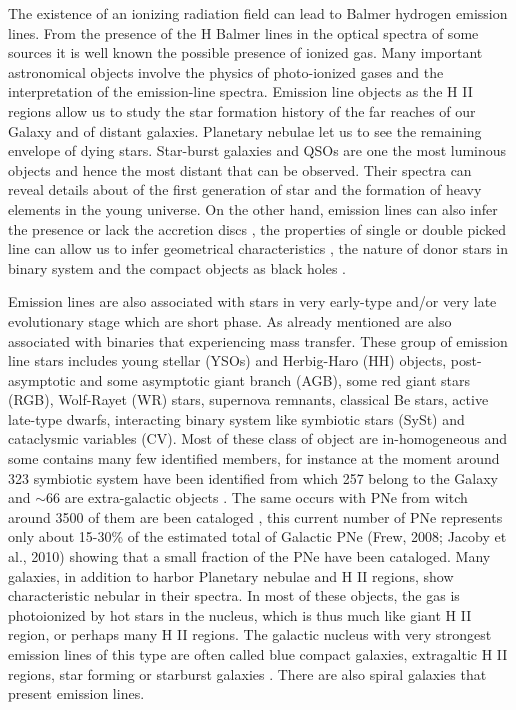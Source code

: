 \documentclass[fleqn,usenatbib]{mnras}
\begin{document}
The existence of an ionizing radiation field can lead to Balmer hydrogen
emission lines. From the presence  of the H Balmer lines in the optical
spectra of some sources it is well known the possible presence of ionized
gas. Many important astronomical objects involve the physics of photo-ionized
gases and the interpretation of the emission-line spectra. Emission line
objects as the H II regions allow us to study the star formation history
of the far reaches of our Galaxy and of distant galaxies. Planetary nebulae
let us to see the remaining envelope of dying stars. Star-burst galaxies and
QSOs are one the most luminous objects and hence the most distant that can
be observed. Their spectra can reveal details about of the first generation
of star and the formation of heavy elements in the young universe. On the
other hand, emission lines can also infer the presence or lack the accretion
discs \citep{Schwope:2000, Ratti:2012}, the properties of single or double
picked line can allow us to infer geometrical characteristics \citep{Horne:1986},
the nature of  donor stars in binary system \citep{Steeghs:2002, Spaandonk:2010,
Casares:2015} and the compact objects as black holes \citep{Casares:2016}. 

Emission lines are also associated with stars in very early-type and/or
very late evolutionary stage which are short phase. As already mentioned
are also associated with binaries that experiencing mass transfer. These
group of emission line stars includes young stellar (YSOs) and Herbig-Haro
(HH) objects, post-asymptotic and some asymptotic giant branch (AGB), some
red giant stars (RGB), Wolf-Rayet (WR) stars, supernova remnants, classical
Be stars, active late-type dwarfs, interacting binary system like symbiotic
stars (SySt) and cataclysmic variables (CV). Most of these class of object
are in-homogeneous and some contains many few identified members, for
instance at the moment around 323 symbiotic system have been identified
from which 257 belong to the Galaxy and  $\sim$66 are extra-galactic
objects \citep{Akras:2019a}. The same occurs with PNe from witch around
3500 of them are been cataloged \citep{Parker:2016}, this current number
of PNe represents only about 15-30\% of the estimated total of Galactic
PNe (Frew, 2008; Jacoby et al., 2010) showing that a small fraction of the
PNe have been cataloged. Many galaxies, in addition to harbor Planetary
nebulae and H II regions, show characteristic nebular in their spectra.
In most of these objects, the gas is photoionized by hot stars in the nucleus,
which is thus much like giant H II region, or perhaps many H II regions.
The galactic nucleus with very strongest  emission lines of this type are
often called blue compact galaxies, extragaltic H II regions, star forming
or starburst galaxies \citep{Osterbrock:2006}. There are also spiral galaxies
that present emission lines.
\end{document}
